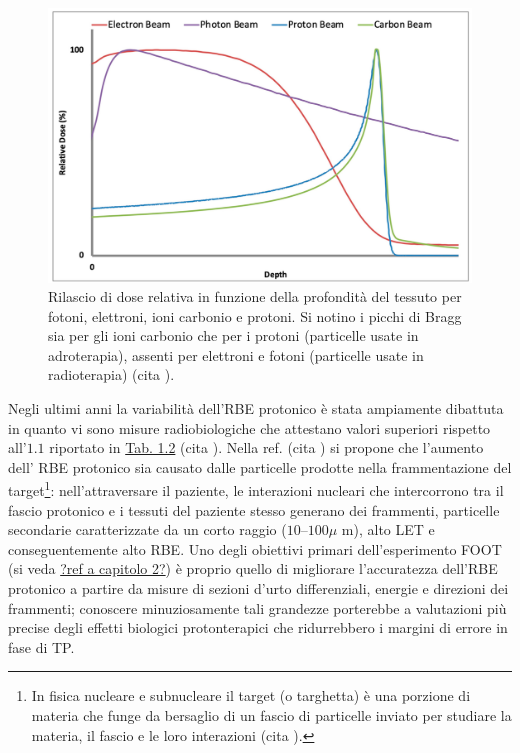 \documentclass[12pt,a4paper,twoside]{report}
\begin{document}
	\begin{figure}[H]
		\centering
		\includegraphics[width=0.9\linewidth]{images/photon.jpg}
		\caption{Rilascio di dose relativa in funzione della profondità del tessuto per fotoni, elettroni, ioni carbonio e protoni. Si notino i picchi di Bragg sia per gli ioni carbonio che per i protoni (particelle usate in adroterapia), assenti per elettroni e fotoni (particelle usate in radioterapia) (cita
			).}
		\label{fig:photon}
	\end{figure}
	
	Negli ultimi anni la variabilità dell'RBE protonico è stata ampiamente dibattuta in quanto vi sono misure radiobiologiche che attestano valori superiori rispetto all'$1.1$ riportato in \hyperref[tab:let_rbe]{Tab. 1.2} (cita
	). Nella ref. (cita
	) si propone che l'aumento dell' RBE protonico sia causato dalle particelle prodotte nella frammentazione del target\footnote{In fisica nucleare e subnucleare il target (o targhetta) è una porzione di materia che funge da bersaglio di un fascio di particelle inviato per studiare la materia, il fascio e le loro interazioni (cita
		).}: nell'attraversare il paziente, le interazioni nucleari che intercorrono tra il fascio protonico e i tessuti del paziente stesso generano dei frammenti, particelle secondarie caratterizzate da un corto raggio ($10$--$100\mu\mbox{ m}$), alto LET e conseguentemente alto RBE. Uno degli obiettivi primari dell'esperimento FOOT (si veda \hyperref[ref a capitolo 2]{?ref a capitolo 2?}) è proprio quello di migliorare l'accuratezza dell'RBE protonico a partire da misure di sezioni d'urto differenziali, energie e direzioni dei frammenti; conoscere minuziosamente tali grandezze porterebbe a valutazioni più precise degli effetti biologici protonterapici che ridurrebbero i margini di errore in fase di TP.
		
\end{document}
